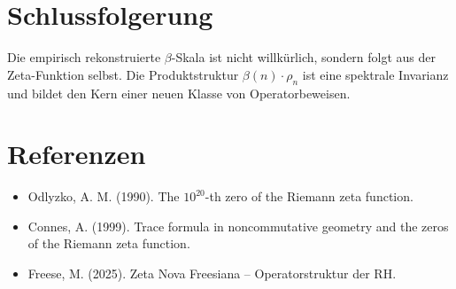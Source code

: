 \documentclass[12pt]{article}
\begin{document}
\section{Schlussfolgerung}
Die empirisch rekonstruierte \(\beta\)-Skala ist nicht willkürlich, sondern folgt aus der Zeta-Funktion selbst. Die Produktstruktur \(\beta(n)\cdot \rho_n\) ist eine spektrale Invarianz und bildet den Kern einer neuen Klasse von Operatorbeweisen.

\section*{Referenzen}
\begin{itemize}
  \item Odlyzko, A. M. (1990). The $10^{20}$-th zero of the Riemann zeta function.
  \item Connes, A. (1999). Trace formula in noncommutative geometry and the zeros of the Riemann zeta function.
  \item Freese, M. (2025). Zeta Nova Freesiana – Operatorstruktur der RH.
\end{itemize}
\end{document}
